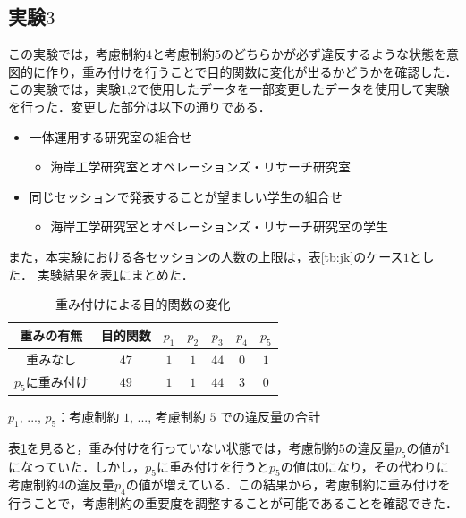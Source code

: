 \documentclass[a4paper,12pt,fleqn]{jarticle}
\begin{document}
\subsection{実験$3$}
この実験では，考慮制約$4$と考慮制約$5$のどちらかが必ず違反するような状態を意図的に作り，重み付けを行うことで目的関数に変化が出るかどうかを確認した．
この実験では，実験$1$,$2$で使用したデータを一部変更したデータを使用して実験を行った．変更した部分は以下の通りである．
\begin{itemize}
\item 一体運用する研究室の組合せ
\begin{itemize}
\item 海岸工学研究室とオペレーションズ・リサーチ研究室
\end{itemize}
\item 同じセッションで発表することが望ましい学生の組合せ
\begin{itemize}
\item 海岸工学研究室とオペレーションズ・リサーチ研究室の学生
\end{itemize}
\end{itemize}
また，本実験における各セッションの人数の上限は，表\ref{tb:jk}のケース$1$とした．
実験結果を表\ref{tb:jikkeny3}にまとめた．
\begin{table}[H]
  \begin{center}
    \caption{重み付けによる目的関数の変化}
    \label{tb:jikkeny3}
    \begin{tabular}{c|cccccc} \toprule
  重みの有無 & 目的関数 & $p_1$ & $p_2$ & $p_3$ & $p_4$ & $p_5$ \\ \toprule
  重みなし & $47$ & $1$ & $1$ & $44$ & $0$ & $1$ \\
  $p_5$に重み付け & $49$ & $1$ & $1$ & $44$ & $3$ & $0$\\ \toprule
    \end{tabular}
    \end{center}
    \hspace{2cm} $p_1$, ..., $p_5$：考慮制約 $1$, ..., 考慮制約 $5$ での違反量の合計
\end{table}

表\ref{tb:jikkeny3}を見ると，重み付けを行っていない状態では，考慮制約$5$の違反量$p_5$の値が$1$になっていた．しかし，$p_5$に重み付けを行うと$p_5$の値は$0$になり，その代わりに考慮制約$4$の違反量$p_4$の値が増えている．この結果から，考慮制約に重み付けを行うことで，考慮制約の重要度を調整することが可能であることを確認できた．

\newpage
\end{document}
